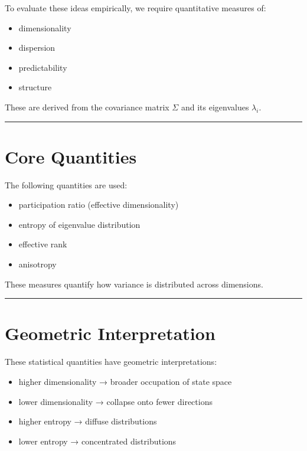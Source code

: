 \documentclass[
  letterpaper,
  DIV=11,
  numbers=noendperiod,
  openany,
  oneside]{scrreprt}
\providecommand{\tightlist}{%
  \setlength{\itemsep}{0pt}\setlength{\parskip}{0pt}}
\begin{document}
To evaluate these ideas empirically, we require quantitative measures
of:

\begin{itemize}
\tightlist
\item
  dimensionality\\
\item
  dispersion\\
\item
  predictability\\
\item
  structure
\end{itemize}

These are derived from the covariance matrix \(\Sigma\) and its
eigenvalues \(\lambda_i\).

\begin{center}\rule{0.5\linewidth}{0.5pt}\end{center}

\section{Core Quantities}\label{core-quantities}

The following quantities are used:

\begin{itemize}
\tightlist
\item
  participation ratio (effective dimensionality)\\
\item
  entropy of eigenvalue distribution\\
\item
  effective rank\\
\item
  anisotropy
\end{itemize}

These measures quantify how variance is distributed across dimensions.

\begin{center}\rule{0.5\linewidth}{0.5pt}\end{center}

\section{Geometric Interpretation}\label{geometric-interpretation}

These statistical quantities have geometric interpretations:

\begin{itemize}
\tightlist
\item
  higher dimensionality → broader occupation of state space\\
\item
  lower dimensionality → collapse onto fewer directions\\
\item
  higher entropy → diffuse distributions\\
\item
  lower entropy → concentrated distributions
\end{itemize}
\end{document}

